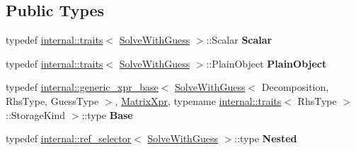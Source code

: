 \subsection*{Public Types}
\begin{DoxyCompactItemize}
\item 
\mbox{\label{class_eigen_1_1_solve_with_guess_aa16d60b352ae942494ea37b974ac7b43}} 
typedef \mbox{\hyperlink{struct_eigen_1_1internal_1_1traits}{internal\+::traits}}$<$ \mbox{\hyperlink{class_eigen_1_1_solve_with_guess}{Solve\+With\+Guess}} $>$\+::Scalar {\bfseries Scalar}
\item 
\mbox{\label{class_eigen_1_1_solve_with_guess_a028591bc4ab3fd37657a4a4e88833e3a}} 
typedef \mbox{\hyperlink{struct_eigen_1_1internal_1_1traits}{internal\+::traits}}$<$ \mbox{\hyperlink{class_eigen_1_1_solve_with_guess}{Solve\+With\+Guess}} $>$\+::Plain\+Object {\bfseries Plain\+Object}
\item 
\mbox{\label{class_eigen_1_1_solve_with_guess_a9d850be775ecb321b2b7a711fdca8e75}} 
typedef \mbox{\hyperlink{struct_eigen_1_1internal_1_1generic__xpr__base}{internal\+::generic\+\_\+xpr\+\_\+base}}$<$ \mbox{\hyperlink{class_eigen_1_1_solve_with_guess}{Solve\+With\+Guess}}$<$ Decomposition, Rhs\+Type, Guess\+Type $>$, \mbox{\hyperlink{struct_eigen_1_1_matrix_xpr}{Matrix\+Xpr}}, typename \mbox{\hyperlink{struct_eigen_1_1internal_1_1traits}{internal\+::traits}}$<$ Rhs\+Type $>$\+::Storage\+Kind $>$\+::type {\bfseries Base}
\item 
\mbox{\label{class_eigen_1_1_solve_with_guess_adea6251ef44d86ce8b8168d031362b76}} 
typedef \mbox{\hyperlink{struct_eigen_1_1internal_1_1ref__selector}{internal\+::ref\+\_\+selector}}$<$ \mbox{\hyperlink{class_eigen_1_1_solve_with_guess}{Solve\+With\+Guess}} $>$\+::type {\bfseries Nested}
\end{DoxyCompactItemize}
